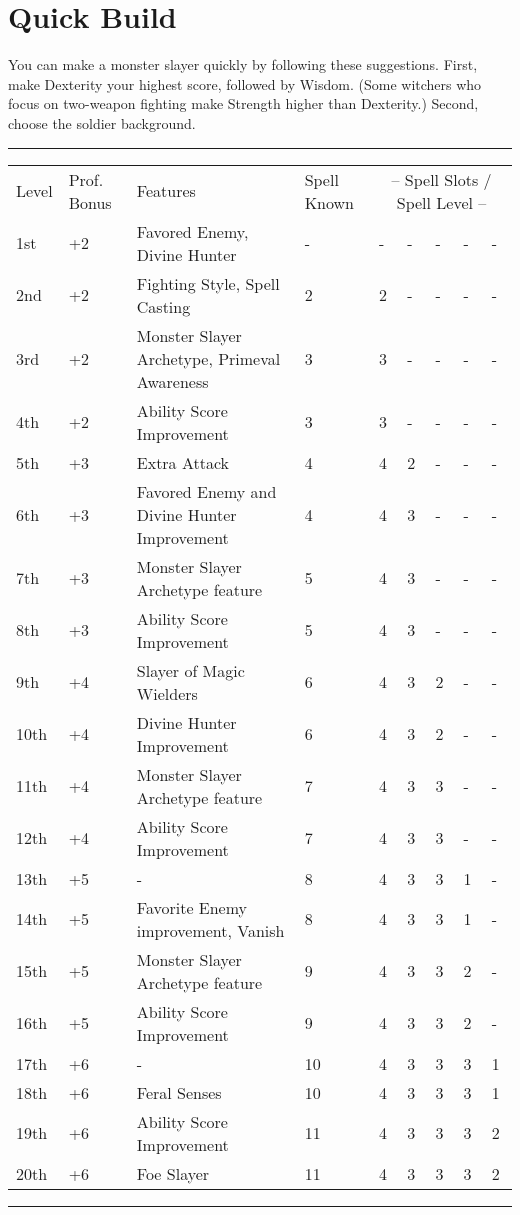 \documentclass[11pt,a4paper,twocolumn, sans]{article}
\begin{document}
	\section*{Quick Build}
	You can make a monster slayer quickly by following these suggestions. First, make Dexterity your highest score, followed by Wisdom. (Some witchers who focus on two-weapon fighting make Strength higher than Dexterity.) Second, choose the soldier background.
	
	\begin{table*}
		\small
		\hrule
		\begin{tabularx}{\textwidth}{|l p{30pt} p{180pt} p{30pt} X X X X X|
			}
			Level & Prof. Bonus & Features & Spell Known & \multicolumn{5}{c|}{-- Spell Slots / Spell Level --} \\
			1st & +2 & Favored Enemy, Divine Hunter & - & - & - & - & - &- \\
			2nd & +2 & Fighting Style, Spell Casting & 2 & 2 & - & - &- &- \\
			3rd & +2 & Monster Slayer Archetype, Primeval Awareness & 3 & 3 & - & - &- &- \\
			4th & +2 & Ability Score Improvement & 3 & 3 & - & - &- &- \\
			5th & +3 & Extra Attack & 4 & 4 & 2 & - & - & - \\
			6th & +3 & Favored Enemy and Divine Hunter Improvement & 4 & 4 & 3 & - & - & - \\
			7th & +3 & Monster Slayer Archetype feature & 5 & 4 & 3  & - & - & - \\
			8th & +3 & Ability Score Improvement & 5 & 4 & 3  & - & - & - \\
			9th & +4 & Slayer of Magic Wielders & 6 & 4 & 3 & 2 & - & - \\
			10th & +4 & Divine Hunter Improvement & 6 & 4 & 3 & 2 & - & - \\
			11th & +4 & Monster Slayer Archetype feature & 7 & 4 & 3  & 3 & - & - \\
			12th & +4 & Ability Score Improvement & 7 & 4 & 3  & 3 & - & - \\
			13th & +5 & - & 8 & 4 & 3 & 3 & 1 & - \\
			14th & +5 & Favorite Enemy improvement, Vanish & 8 & 4 & 3 & 3 & 1 & - \\
			15th & +5 & Monster Slayer Archetype feature & 9 & 4 & 3 & 3 & 2 & - \\
			16th & +5 & Ability Score Improvement & 9 & 4 & 3 & 3 & 2 & - \\
			17th & +6 & - & 10 & 4 & 3 & 3 & 3 & 1 \\
			18th & +6 & Feral Senses & 10 & 4 & 3 & 3 & 3 & 1 \\
			19th & +6 & Ability Score Improvement & 11 & 4 & 3 & 3 & 3 & 2 \\
			20th & +6 & Foe Slayer & 11 & 4 & 3 & 3 & 3 & 2 \\
		\end{tabularx}
		\hrule
	\end{table*}
\end{document}
